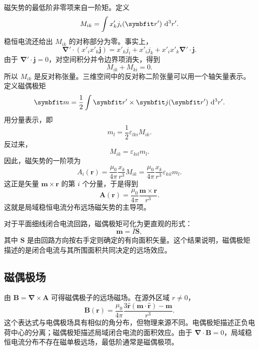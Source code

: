 磁矢势的最低阶非零项来自一阶矩。定义
\[
M_{ik}
=
\int
x'_{k}j_i(\bm{r}')
\,\dif^{3}r'.
\]
稳恒电流还给出 $M_{ik}$ 的对称部分为零。事实上，
\[
\bm{\nabla}'\cdot(x'_ix'_k\bm{j})
=
x'_k j_i
+
x'_i j_k
+
x'_ix'_k\bm{\nabla}'\cdot\bm{j}.
\]
由于 $\bm{\nabla}'\cdot\bm{j}=0$，对空间积分并令边界项消失，得到
\[
M_{ik}+M_{ki}=0.
\]
所以 $M_{ik}$ 是反对称张量。三维空间中的反对称二阶张量可以用一个轴矢量表示。定义磁偶极矩
\begin{equation}
	\bm{m}
	=
	\frac{1}{2}
	\int
	\bm{r}'\times\bm{j}(\bm{r}')
	\,\dif^{3}r'.
	\label{eq:11:magnetic-dipole-moment}
\end{equation}
用分量表示，即
\[
m_l
=
\frac{1}{2}
\varepsilon_{lki}M_{ik}.
\]
反过来，
\[
M_{ik}
=
\varepsilon_{kil}m_l.
\]
因此，磁矢势的一阶项为
\[
A_i(\bm{r})
=
\frac{\mu_{0}}{4\pi}
\frac{x_k}{r^{3}}
M_{ik}
=
\frac{\mu_{0}}{4\pi}
\frac{x_k}{r^{3}}
\varepsilon_{kil}m_l.
\]
这正是矢量 $\bm{m}\times\bm{r}$ 的第 $i$ 个分量，于是得到
\begin{equation}
	\bm{A}(\bm{r})
	=
	\frac{\mu_{0}}{4\pi}
	\frac{\bm{m}\times\bm{r}}{r^{3}}.
	\label{eq:11:magnetic-dipole-a}
\end{equation}
这就是局域稳恒电流分布远场磁矢势的主导项。

对于平面细线闭合电流回路，磁偶极矩可化为更直观的形式：
\[
\bm{m}
=
I\bm{S},
\]
其中 $\bm{S}$ 是由回路方向按右手定则确定的有向面积矢量。这个结果说明，磁偶极矩描述的是闭合电流与其所围面积共同决定的远场效应。

\subsection{磁偶极场}

由 $\bm{B}=\bm{\nabla}\times\bm{A}$ 可得磁偶极子的远场磁场。在源外区域 $r\neq 0$，
\begin{equation}
	\bm{B}(\bm{r})
	=
	\frac{\mu_{0}}{4\pi}
	\frac{
		3\hat{\bm{r}}(\bm{m}\cdot\hat{\bm{r}})
		-
		\bm{m}
	}{r^{3}}.
	\label{eq:11:magnetic-dipole-b}
\end{equation}
这个表达式与电偶极场具有相似的角分布，但物理来源不同。电偶极矩描述正负电荷中心的分离；磁偶极矩描述局域闭合电流的面积效应。由于 $\bm{\nabla}\cdot\bm{B}=0$，局域稳恒电流分布不存在磁单极远场，最低阶通常是磁偶极项。

